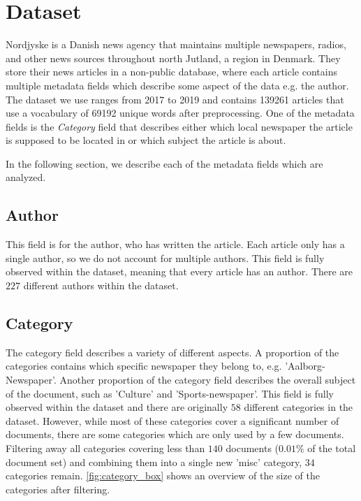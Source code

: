 \section{Dataset}
Nordjyske is a Danish news agency that maintains multiple newspapers, radios, and other news sources throughout north Jutland, a region in Denmark.
They store their news articles in a non-public database, where each article contains multiple metadata fields which describe some aspect of the data e.g. the author.
The dataset we use ranges from 2017 to 2019 and contains 139261 articles that use a vocabulary of 69192 unique words after preprocessing.
One of the metadata fields is the \emph{Category} field that describes either which local newspaper the article is supposed to be located in or which subject the article is about.

In the following section, we describe each of the metadata fields which are analyzed.

\subsection{Author}
This field is for the author, who has written the article.
Each article only has a single author, so we do not account for multiple authors.
This field is fully observed within the dataset, meaning that every article has an author.
There are $227$ different authors within the dataset.

\subsection{Category}
The category field describes a variety of different aspects.
A proportion of the categories contains which specific newspaper they belong to, e.g. 'Aalborg-Newspaper'.
Another proportion of the category field describes the overall subject of the document, such as 'Culture' and 'Sports-newspaper'.
This field is fully observed within the dataset and there are originally $58$ different categories in the dataset.
However, while most of these categories cover a significant number of documents, there are some categories which are only used by a few documents.
Filtering away all categories covering less than $140$ documents ($0.01\%$ of the total document set) and combining them into a single new 'misc' category, $34$ categories remain.
\autoref{fig:category_box} shows an overview of the size of the categories after filtering.

